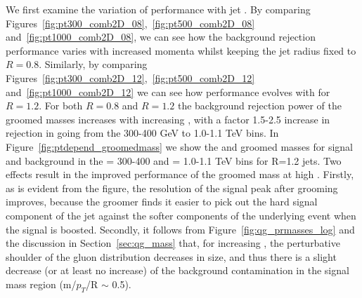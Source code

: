 We first examine the variation of performance with jet \pT. By comparing
Figures~\ref{fig:pt300_comb2D_08},~\ref{fig:pt500_comb2D_08}
and~\ref{fig:pt1000_comb2D_08}, we can see how the background
rejection performance varies with increased momenta whilst keeping the jet
radius fixed to $R=0.8$. Similarly, by comparing Figures~\ref{fig:pt300_comb2D_12},~\ref{fig:pt500_comb2D_12}
and~\ref{fig:pt1000_comb2D_12} we can see how performance evolves with
\pT for $R=1.2$. For both $R=0.8$ and $R=1.2$ the background rejection power of
the groomed masses increases with increasing \pT, with a factor 1.5-2.5 increase in rejection in going from the 300-400 GeV to
1.0-1.1 TeV bins. In Figure~\ref{fig:ptdepend_groomedmass} we show the
\msd and \mprun groomed masses for signal and background in the \pT = 300-400 and \pT = 1.0-1.1 TeV bins for R=1.2 jets. Two effects result in the improved
performance of the groomed mass at high \pT. Firstly, as is evident
from the figure, the resolution of the signal peak after grooming
improves, because the groomer finds it easier to pick out the hard
signal component of the jet against the softer components of the
underlying event when the signal is boosted. Secondly, it follows
from Figure~\ref{fig:qg_prmasses_log} and the discussion in Section~\ref{sec:qg_mass}
that, for increasing \pT, the perturbative shoulder of the gluon
distribution decreases in size, and
thus there is a slight decrease (or at least no increase) of the background contamination in the
signal mass region (m/$p_{T}$/R $\sim$ 0.5). 

